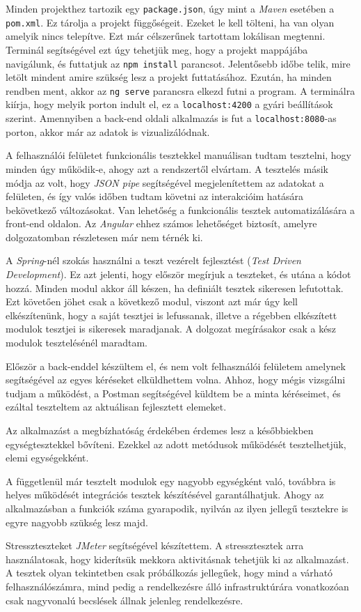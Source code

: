 Minden projekthez tartozik egy \texttt{package.json}, úgy mint a \textit{Maven} esetében a \texttt{pom.xml}. Ez tárolja a projekt függőségeit. Ezeket le kell tölteni, ha van olyan amelyik nincs telepítve. Ezt már célszerűnek tartottam lokálisan megtenni. Terminál segítségével ezt úgy tehetjük meg, hogy a projekt mappájába navigálunk, és futtatjuk az \texttt{npm install} parancsot. Jelentősebb időbe telik, mire letölt mindent amire szükség lesz a projekt futtatásához. Ezután, ha minden rendben ment, akkor az \texttt{ng serve} parancsra elkezd futni a program. A terminálra kiírja, hogy melyik porton indult el, ez a \texttt{localhost:4200} a gyári beállítások szerint. Amennyiben a back-end oldali alkalmazás is fut a \texttt{localhost:8080}-as porton, akkor már az adatok is vizualizálódnak.



A felhasználói felületet funkcionális tesztekkel manuálisan tudtam tesztelni, hogy minden úgy működik-e, ahogy azt a rendszertől elvártam. A tesztelés másik módja az volt, hogy \textit{JSON pipe} segítségével megjelenítettem az adatokat a felületen, és így valós időben tudtam követni az interakcióim hatására bekövetkező változásokat. Van lehetőség a funkcionális tesztek automatizálására a front-end oldalon. Az \textit{Angular} ehhez számos lehetőséget biztosít, amelyre dolgozatomban részletesen már nem térnék ki.


A \textit{Spring}-nél szokás használni a teszt vezérelt fejlesztést (\textit{Test Driven Development}). Ez azt jelenti, hogy először megírjuk a teszteket, és utána a kódot hozzá. Minden modul akkor áll készen, ha definiált tesztek sikeresen lefutottak. Ezt követően jöhet csak a következő modul, viszont azt már úgy kell elkészítenünk, hogy a saját tesztjei is lefussanak, illetve a régebben elkészített modulok tesztjei is sikeresek maradjanak. A dolgozat megírásakor csak a kész modulok tesztelésénél maradtam.

Először a back-enddel készültem el, és nem volt felhasználói felületem amelynek segítségével az egyes kéréseket elküldhettem volna. Ahhoz, hogy mégis vizsgálni tudjam a működést, a Postman segítségével küldtem be a minta kéréseimet, és ezáltal teszteltem az aktuálisan fejlesztett elemeket.

Az alkalmazást a megbízhatóság érdekében érdemes lesz a későbbiekben egységtesztekkel bővíteni. Ezekkel az adott metódusok működését tesztelhetjük, elemi egységekként.

A függetlenül már tesztelt modulok egy nagyobb egységként való, továbbra is helyes működését integrációs tesztek készítésével garantálhatjuk. Ahogy az alkalmazásban a funkciók száma gyarapodik, nyilván az ilyen jellegű tesztekre is egyre nagyobb szükség lesz majd.

Stresszteszteket \textit{JMeter} segítségével készítettem. A stressztesztek arra használatosak, hogy kiderítsük mekkora aktivitásnak tehetjük ki az alkalmazást. A tesztek olyan tekintetben csak próbálkozás jellegűek, hogy mind a várható felhasználószámra, mind pedig a rendelkezésre álló infrastruktúrára vonatkozóan csak nagyvonalú becslések állnak jelenleg rendelkezésre.
